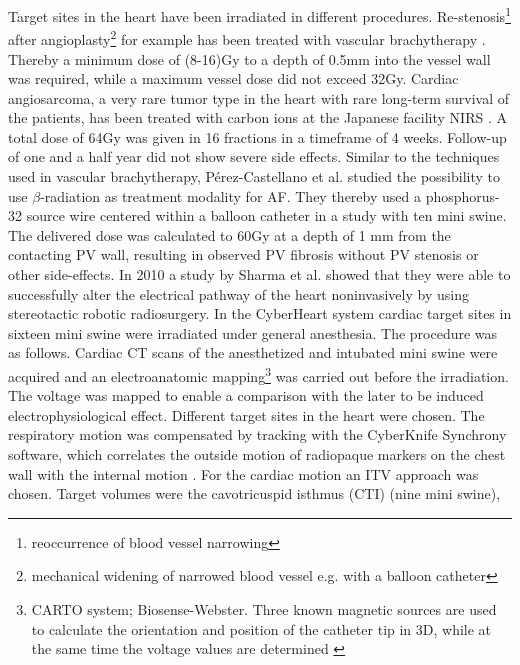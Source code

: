 Target sites in the heart have been irradiated in different procedures. Re-stenosis\footnote{reoccurrence of blood vessel narrowing} after 
angioplasty\footnote{mechanical widening of narrowed blood vessel e.g. with a balloon catheter} for example has been treated with vascular 
brachytherapy \cite{Nat99, Cot05}. Thereby a minimum dose of (8-16)Gy to a depth of 0.5mm into the vessel wall was required, while a 
maximum vessel dose did not exceed 32Gy. Cardiac angiosarcoma, a very rare tumor type in the heart with rare long-term 
survival of the patients, has been treated with carbon ions at the Japanese facility NIRS \cite{Aok04}. A total dose of 64Gy was given in 16 
fractions in a timeframe of 4 weeks. Follow-up of one and a half year did not show severe side effects.\newline
\newline
Similar to the techniques used in vascular brachytherapy, P\'erez-Castellano et al. \cite{Per06} studied the possibility to use $\beta$-radiation 
as treatment modality for AF. They thereby used a phosphorus-32 source wire centered within a balloon catheter in a study with ten mini swine. 
The delivered dose was calculated to 60Gy at a depth of 1 mm from the contacting PV wall, resulting in observed PV fibrosis without PV stenosis 
or other side-effects.\newline
\newline
In 2010 a study by Sharma et al. \cite{Sha10} showed that they were able to successfully alter the electrical pathway of the heart 
noninvasively by using stereotactic robotic radiosurgery. In the CyberHeart system cardiac target sites in sixteen mini swine were irradiated 
under general anesthesia. The procedure was as follows. Cardiac CT scans of the anesthetized and intubated mini swine were acquired and an 
electroanatomic mapping\footnote{CARTO system; Biosense-Webster. Three known magnetic sources are used to calculate the orientation 
and position of the catheter tip in 3D, while at the same time the voltage values are determined \cite{bw}} was carried out before the 
irradiation. The voltage was mapped to enable a comparison with the later to be induced electrophysiological effect. Different target sites 
in the heart were chosen. The respiratory motion was compensated by tracking with the CyberKnife Synchrony software, which correlates the 
outside motion of radiopaque markers on the chest wall with the internal motion 
\cite{Ozh08}. For the cardiac motion an ITV approach was chosen. Target volumes were the cavotricuspid isthmus (CTI) (nine mini swine), 
